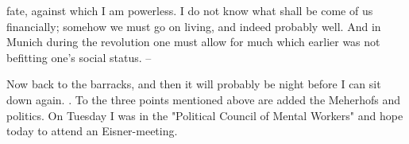 fate, against which I am powerless. I do not know what shall be come of us financially; somehow we must go on living, and indeed probably well. And in Munich during the revolution one must allow for much which earlier was not befitting one's social status. --

Now back to the barracks, and then it will probably be night before I can sit down again. . To the three points mentioned above are added the Meherhofs and politics. On Tuesday I was in the "Political Council of Mental Workers" and hope today to attend an Eisner-meeting.

